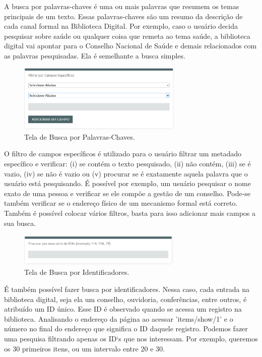 A busca por palavras-chaves é uma ou mais palavras que resumem os temas principais de um texto. Essas palavras-chaves são um resumo da descrição de cada canal formal na Biblioteca Digital.  Por exemplo, caso o usuário decida pesquisar sobre saúde ou qualquer coisa que remeta ao tema saúde, a biblioteca digital vai apontar para o Conselho Nacional de Saúde e demais relacionados com as palavras pesquisadas. Ela é semelhante a busca simples.

\graphicspath{{figuras/prototipo/}}
\begin{figure}[H]
\centering
\includegraphics[width=0.7\textwidth]{busca-assunto-especifico}
\caption{Tela de Busca por Palavras-Chaves.}
\label{fig:buscaespecifico_prototipo}
\end{figure}

O filtro de campos específicos é utilizado para o usuário filtrar um metadado específico e verificar: (i) se contém o texto pesquisado, (ii) não contém, (iii) se é vazio, (iv) se não é vazio ou (v) procurar se é exatamente aquela palavra que o usuário está pesquisando. É possível por exemplo, um usuário pesquisar o nome exato de uma pessoa e verificar se ele compõe a gestão de um conselho. Pode-se também verificar se o endereço físico de um mecanismo formal está correto. Também é possível colocar vários filtros, basta para isso adicionar mais campos a sua busca.

\graphicspath{{figuras/prototipo/}}
\begin{figure}[H]
\centering
\includegraphics[width=0.7\textwidth]{busca-identificadores}
\caption{Tela de Busca por Identificadores.}
\label{fig:buscaidentificadores_prototipo}
\end{figure}

É também possível fazer busca por identificadores. Nessa caso, cada entrada na biblioteca digital, seja ela um conselho, ouvidoria, conferências, entre outros, é atribuído um ID único. Esse ID é observado quando se acessa um registro na biblioteca. Analisando o endereço da página ao acessar 'items/show/1' e o número no final do endereço que significa o ID daquele registro. Podemos fazer uma pesquisa filtrando apenas os ID`s que nos interessam. Por exemplo, queremos os 30 primeiros itens, ou um intervalo entre 20 e 30.

